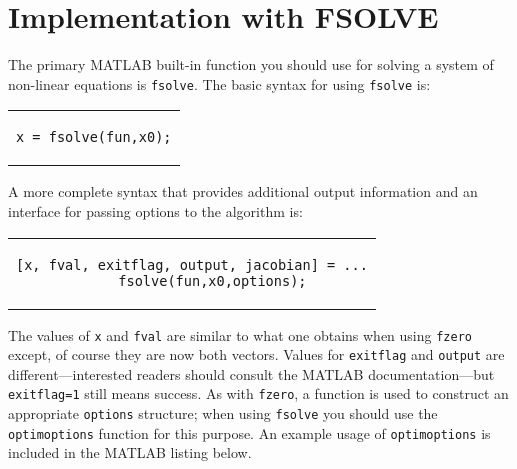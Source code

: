 \section{Implementation with FSOLVE}
The primary MATLAB built-in function you should use for solving a system of non-linear equations is \lstinline[style=myMatlab]{fsolve}.  The basic syntax for using \lstinline[style=myMatlab]{fsolve} is:
\begin{center}
\begin{tabular}{c}
\begin{lstlisting}[style=myMatlab, frame=none, numbers=none, basicstyle=\small]
x = fsolve(fun,x0);
\end{lstlisting}
\end{tabular}
\end{center}
A more complete syntax that provides additional output information and an interface for passing options to the algorithm is:
\begin{center}
\begin{tabular}{c}
\begin{lstlisting}[style=myMatlab, frame=none, numbers=none, basicstyle=\small]
[x, fval, exitflag, output, jacobian] = ...
     fsolve(fun,x0,options);
\end{lstlisting}
\end{tabular}
\end{center}
The values of \lstinline[style=myMatlab]{x} and \lstinline[style=myMatlab]{fval} are similar to what one obtains when using \lstinline[style=myMatlab]{fzero} except, of course they are now both vectors.  Values for \lstinline[style=myMatlab]{exitflag} and \lstinline[style=myMatlab]{output} are different---interested readers should consult the MATLAB documentation---but \lstinline[style=myMatlab]{exitflag=1} still means success.  As with \lstinline[style=myMatlab]{fzero}, a function is used to construct an appropriate \lstinline[style=myMatlab]{options} structure; when using \lstinline[style=myMatlab]{fsolve} you should use the \lstinline[style=myMatlab]{optimoptions} function for this purpose. An example usage of \lstinline[style=myMatlab]{optimoptions} is included in the MATLAB listing below.

\vspace{3.0cm}


